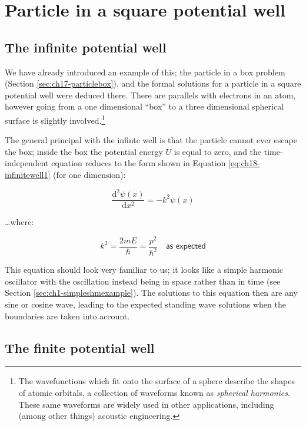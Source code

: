 \documentclass[
]{book}
\begin{document}
\hypertarget{sec:ch18-partsquarewell1}{%
\section{Particle in a square potential well}\label{sec:ch18-partsquarewell1}}

\hypertarget{the-infinite-potential-well}{%
\subsection{The infinite potential well}\label{the-infinite-potential-well}}

We have already introduced an example of this; the particle in a box problem (Section \ref{sec:ch17-particlebox}), and the formal solutions for a particle in a square potential well were deduced there. There are parallels with electrons in an atom, however going from a one dimensional ``box'' to a three dimensional spherical surface is slightly involved.\footnote{The wavefunctions which fit onto the surface of a sphere describe the shapes of atomic orbitals, a collection of waveforms known as \emph{spherical harmonics}. These same waveforms are widely used in other applications, including (among other things) acoustic engineering.}

The general principal with the infinte well is that the particle cannot ever escape the box; inside the box the potential energy \(U\) is equal to zero, and the time-independent equation reduces to the form shown in Equation \eqref{eq:ch18-infinitewell1} (for one dimension):

\begin{equation}
\frac{\mathrm{d}^2 \psi(x)}{\mathrm{d}x^2} = -k^2 \psi(x)
\label{eq:ch18-infinitewell1}
\end{equation}

\ldots where:

\begin{equation}
k^2 = \frac{2mE}{\hbar} = \frac{p^2}{\hbar^2} \quad \textsf{as expected}
\end{equation}

This equation should look very familiar to us; it looks like a simple harmonic oscillator with the oscillation instead being in space rather than in time (see Section \ref{sec:ch1-simpleshmexample}). The solutions to this equation then are any sine or cosine wave, leading to the expected standing wave solutions when the boundaries are taken into account.

\hypertarget{the-finite-potential-well}{%
\subsection{The finite potential well}\label{the-finite-potential-well}}
\end{document}
